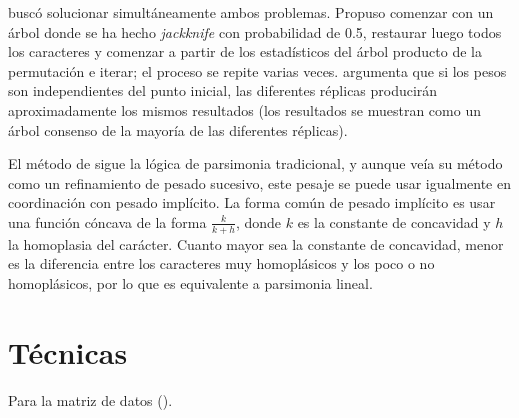 \cite{Farris2001} busc\'o solucionar simult\'aneamente ambos problemas. Propuso comenzar con un \'arbol donde se ha hecho \textit{jackknife} con probabilidad de 0.5, restaurar luego todos los caracteres y comenzar a partir de los estad\'isticos del \'arbol producto de la permutaci\'on e iterar; el proceso se repite varias veces. \cite{Farris2001} argumenta que si los pesos son independientes del punto inicial, las diferentes r\'eplicas producir\'an aproximadamente los mismos resultados (los resultados se muestran como un \'arbol consenso de la mayor\'ia de las diferentes r\'eplicas).

El m\'etodo de \cite{Goloboff1993} sigue la l\'ogica de parsimonia tradicional, y aunque \cite{Goloboff1993} ve\'ia su m\'etodo como un refinamiento de pesado sucesivo, este pesaje se puede usar igualmente en coordinaci\'on con pesado impl\'icito. La forma com\'un de pesado impl\'icito es usar una funci\'on c\'oncava de la forma $\frac{k}{k + h}$, donde $k$ es la constante de concavidad y $h$ la homoplasia del car\'acter. Cuanto mayor sea la constante de concavidad, menor es la diferencia entre los caracteres muy homopl\'asicos y los poco o no homopl\'asicos, por lo que es equivalente a parsimonia lineal.

\section*{T\'ecnicas}

Para la matriz de datos ().

